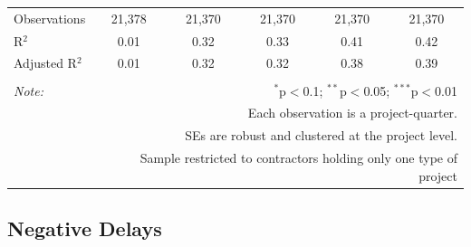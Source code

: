 \documentclass[
]{article}
\begin{document}
\begin{table}[H]
\begin{tabular}{@{\extracolsep{-2pt}}lccccc}
Observations & 21,378 & 21,370 & 21,370 & 21,370 & 21,370 \\ 
R$^{2}$ & 0.01 & 0.32 & 0.33 & 0.41 & 0.42 \\ 
Adjusted R$^{2}$ & 0.01 & 0.32 & 0.32 & 0.38 & 0.39 \\ 
\hline 
\hline \\[-1.8ex] 
\textit{Note:}  & \multicolumn{5}{r}{$^{*}$p$<$0.1; $^{**}$p$<$0.05; $^{***}$p$<$0.01} \\ 
 & \multicolumn{5}{r}{Each observation is a project-quarter.} \\ 
 & \multicolumn{5}{r}{SEs are robust and clustered at the project level.} \\ 
 & \multicolumn{5}{r}{Sample restricted to contractors holding only one type of project} \\ 
\end{tabular} 
\end{table}

\hypertarget{negative-delays}{%
\subsection{Negative Delays}\label{negative-delays}}
\end{document}
